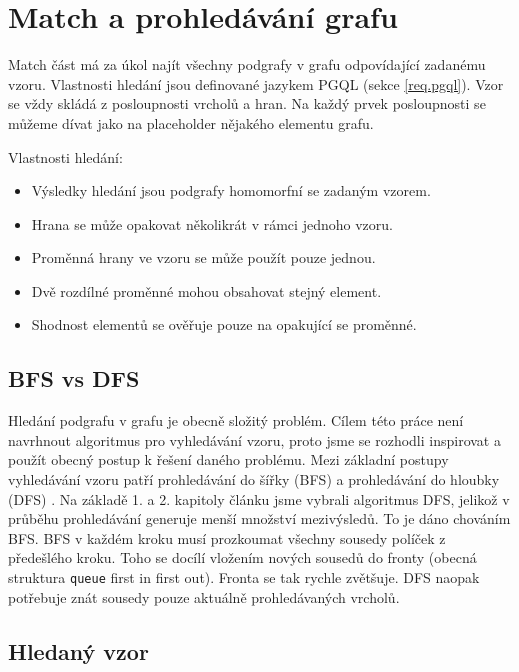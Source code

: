 \section{Match a prohledávání grafu}

Match část má za úkol najít všechny podgrafy v grafu odpovídající zadanému vzoru.
Vlastnosti hledání jsou definované jazykem PGQL (sekce \ref{req.pgql}).
Vzor se vždy skládá z posloupnosti vrcholů a hran.
Na každý prvek posloupnosti se můžeme dívat jako na placeholder nějakého elementu grafu.

Vlastnosti hledání:
\begin{itemize}

\item Výsledky hledání jsou podgrafy homomorfní se zadaným vzorem.
\item Hrana se může opakovat několikrát v rámci jednoho vzoru.
\item Proměnná hrany ve vzoru se může použít pouze jednou.
\item Dvě rozdílné proměnné mohou obsahovat stejný element.
\item Shodnost elementů se ověřuje pouze na opakující se proměnné.

\end{itemize}

\subsection{BFS vs DFS}

Hledání podgrafu v grafu je obecně složitý problém. 
Cílem této práce není navrhnout algoritmus pro vyhledávání vzoru, proto jsme se rozhodli inspirovat a použít obecný postup k řešení daného problému.
Mezi základní postupy vyhledávání vzoru patří prohledávání do šířky (BFS) a prohledávání do hloubky (DFS) \citep[kap. 4]{graphAlg}. 
Na základě 1. a 2. kapitoly článku \citet{asyncPGX} jsme vybrali algoritmus DFS, jelikož v průběhu prohledávání generuje menší množství mezivýsledů.
To je dáno chováním BFS. 
BFS v každém kroku musí prozkoumat všechny sousedy políček z předešlého kroku.
Toho se docílí vložením nových sousedů do fronty (obecná struktura \texttt{queue} first in first out).
Fronta se tak rychle zvětšuje.
DFS naopak potřebuje znát sousedy pouze aktuálně prohledávaných vrcholů.

\subsection{Hledaný vzor}

